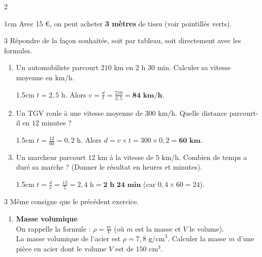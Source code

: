 \documentclass[a4paper]{book}
\begin{document}
{\begin{exerciceNote}{2}
\begin{enumerate}[leftmargin=*]
            \begin{ZoneReponse}{1cm}           
            Avec 15 €, on peut acheter \textbf{3 mètres} de tissu (voir pointillés verts).
            \end{ZoneReponse}
        \end{enumerate}
    \end{exerciceNote}

    \begin{exerciceNote}{3}
        Répondre de la façon souhaitée, soit par tableau, soit directement avec les formules.
        \begin{enumerate}[leftmargin=*]
            \item Un automobiliste parcourt $210 \text{ km}$ en $2 \text{ h } 30 \text{ min}$. Calculer sa vitesse moyenne en $\text{km/h}$.

            \begin{ZoneReponse}{1.5cm}           
            $t = 2,5 \text{ h}$. Alors $v = \frac{d}{t} = \frac{210}{2,5} = \mathbf{84 \text{ km/h}}$.
            \end{ZoneReponse}

            \item Un TGV roule à une vitesse moyenne de $300 \text{ km/h}$. Quelle distance parcourt-il en $12$ minutes ? 

            \begin{ZoneReponse}{1.5cm}         
            $t = \frac{12}{60} = 0,2 \text{ h}$. Alors $d = v \times t = 300 \times 0,2 = \mathbf{60 \text{ km}}$.
            \end{ZoneReponse}

            \item Un marcheur parcourt $12 \text{ km}$ à la vitesse de $5 \text{ km/h}$. Combien de temps a duré sa marche ? (Donner le résultat en heures et minutes).

            \begin{ZoneReponse}{1.5cm}           
            $t = \frac{d}{v} = \frac{12}{5} = 2,4 \text{ h} = \mathbf{2 \text{ h } 24 \text{ min}}$ (car $0,4 \times 60 = 24$).
            \end{ZoneReponse}
        \end{enumerate}        
    \end{exerciceNote}
    

    \begin{exerciceNote}{3} 
        Même consigne que le précédent exercice.
        \begin{enumerate}[leftmargin=*]
            \item \textbf{Masse volumique} \\
            On rappelle la formule : $\rho = \frac{m}{V}$ (où $m$ est la masse et $V$ le volume). \\
            La masse volumique de l'acier est $\rho = 7,8 \text{ g/cm}^3$. 
            Calculer la masse $m$ d'une pièce en acier dont le volume $V$ est de $150 \text{ cm}^3$.


\end{enumerate}
\end{exerciceNote}}
\end{document}
